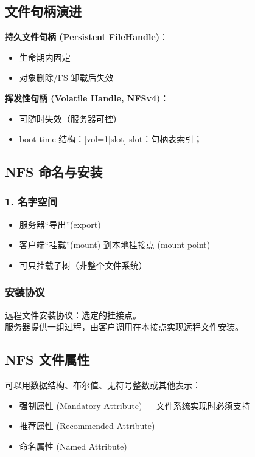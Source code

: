 \subsection{文件句柄演进}

\textbf{持久文件句柄 (Persistent FileHandle)}：
\begin{itemize}
    \item 生命期内固定
    \item 对象删除/FS 卸载后失效
\end{itemize}

\textbf{挥发性句柄 (Volatile Handle, NFSv4)}：
\begin{itemize}
    \item 可随时失效（服务器可控）
    \item boot-time 结构：[vol=1|slot] slot：句柄表索引；
\end{itemize}

\subsection{NFS 命名与安装}

\subsubsection{1. 名字空间}
\begin{itemize}
    \item 服务器“导出”(export)
    \item 客户端“挂载”(mount) 到本地挂接点 (mount point)
    \item 可只挂载子树（非整个文件系统）
\end{itemize}

\subsubsection{安装协议}
远程文件安装协议：选定的挂接点。\\
服务器提供一组过程，由客户调用在本接点实现远程文件安装。

\subsection{NFS 文件属性}
可以用数据结构、布尔值、无符号整数或其他表示：
\begin{itemize}
    \item 强制属性 (Mandatory Attribute) --- 文件系统实现时必须支持
    \item 推荐属性 (Recommended Attribute)
    \item 命名属性 (Named Attribute)
\end{itemize}

